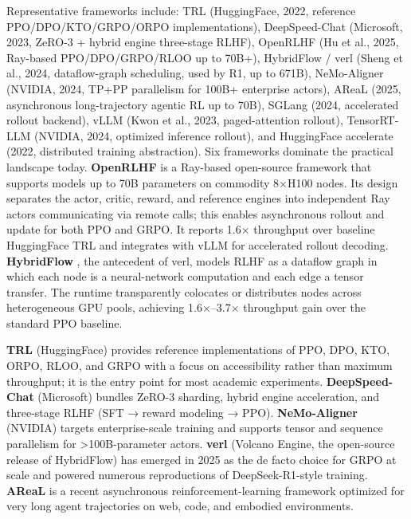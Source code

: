 \documentclass{article}
\begin{document}
Representative frameworks include: TRL (HuggingFace, 2022, reference PPO/DPO/KTO/GRPO/ORPO implementations), DeepSpeed-Chat (Microsoft, 2023, ZeRO-3 + hybrid engine three-stage RLHF), OpenRLHF (Hu et al., 2025, Ray-based PPO/DPO/GRPO/RLOO up to 70B+), HybridFlow / verl (Sheng et al., 2024, dataflow-graph scheduling, used by R1, up to 671B), NeMo-Aligner (NVIDIA, 2024, TP+PP parallelism for 100B+ enterprise actors), AReaL (2025, asynchronous long-trajectory agentic RL up to 70B), SGLang (2024, accelerated rollout backend), vLLM (Kwon et al., 2023, paged-attention rollout), TensorRT-LLM (NVIDIA, 2024, optimized inference rollout), and HuggingFace accelerate (2022, distributed training abstraction). Six frameworks dominate the practical landscape today. \textbf{OpenRLHF} \citep{hu20252025} is a Ray-based open-source framework that supports models up to 70B parameters on commodity 8×H100 nodes. Its design separates the actor, critic, reward, and reference engines into independent Ray actors communicating via remote calls; this enables asynchronous rollout and update for both PPO and GRPO. It reports 1.6× throughput over baseline HuggingFace TRL and integrates with vLLM for accelerated rollout decoding. \textbf{HybridFlow} \citep{sheng20242024}, the antecedent of verl, models RLHF as a dataflow graph in which each node is a neural-network computation and each edge a tensor transfer. The runtime transparently colocates or distributes nodes across heterogeneous GPU pools, achieving 1.6×--3.7× throughput gain over the standard PPO baseline.

\textbf{TRL} (HuggingFace) provides reference implementations of PPO, DPO, KTO, ORPO, RLOO, and GRPO with a focus on accessibility rather than maximum throughput; it is the entry point for most academic experiments. \textbf{DeepSpeed-Chat} (Microsoft) bundles ZeRO-3 sharding, hybrid engine acceleration, and three-stage RLHF (SFT → reward modeling → PPO). \textbf{NeMo-Aligner} (NVIDIA) targets enterprise-scale training and supports tensor and sequence parallelism for \textgreater100B-parameter actors. \textbf{verl} (Volcano Engine, the open-source release of HybridFlow) has emerged in 2025 as the de facto choice for GRPO at scale and powered numerous reproductions of DeepSeek-R1-style training. \textbf{AReaL} is a recent asynchronous reinforcement-learning framework optimized for very long agent trajectories on web, code, and embodied environments.
\end{document}
